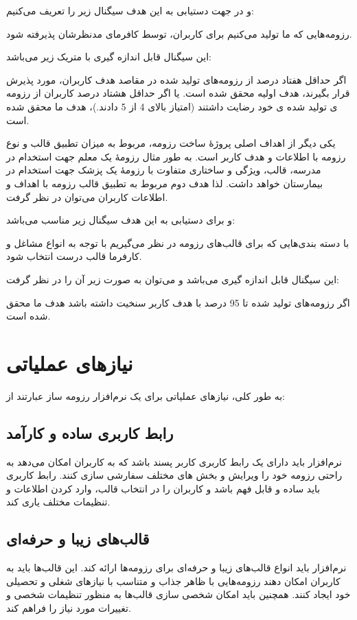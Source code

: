\documentclass[]{article}
\begin{document}
	و در جهت دستیابی به این هدف سیگنال زیر را تعریف می‌کنیم:
	
	رزومه‌هایی که ما تولید می‌کنیم برای کاربران، توسط کافرمای مدنظرشان پذیرفته شود.
	
	این سیگنال قابل اندازه گیری با متریک زیر می‌باشد:
	
	اگر حداقل هفتاد درصد از رزومه‌های تولید شده در مقاصد هدف کاربران، مورد پذیرش قرار بگیرند‌، هدف اولیه محقق شده است.
	یا اگر حداقل هشتاد درصد کاربران از رزومه ی تولید شده ی خود رضایت داشتند (امتیاز بالای 4 از 5 دادند.)، هدف ما محقق شده است.
	
	یکی دیگر از اهداف اصلی پروژۀ ساخت رزومه، مربوط به میزان تطبیق قالب و نوع رزومه با اطلاعات و هدف کاربر است. به طور مثال رزومۀ یک معلم جهت استخدام در مدرسه، قالب، ویژگی و ساختاری متفاوت با رزومۀ یک پزشک جهت استخدام در بیمارستان خواهد داشت. 
	لذا هدف دوم مربوط به تطبیق قالب رزومه با اهداف و اطلاعات کاربران می‌توان در نظر گرفت.
	
	
	و برای دستیابی به این هدف سیگنال زیر مناسب می‌باشد:
	
	 با دسته بندی‌هایی که برای قالب‌های رزومه در نظر می‌گیریم با توجه به انواع مشاغل و کارفرما قالب درست انتخاب ‌شود.
	 
	این سیگنال قابل اندازه گیری می‌باشد و می‌توان به صورت زیر آن را در نظر گرفت:
	
 اگر رزومه‌های تولید شده تا 95 درصد با هدف کاربر سنخیت داشته باشد هدف ما محقق شده است.
	
	
	
	
	\section{\huge{نیازهای عملیاتی}}
	
	
	به طور کلی، نیازهای عملیاتی برای یک نرم‌افزار رزومه ساز عبارتند از:
	
	\subsection{\LARGE{رابط کاربری ساده و کارآمد}}
	نرم‌افزار باید دارای یک رابط کاربری کاربر پسند باشد که به کاربران امکان می‌دهد به راحتی رزومه خود را ویرایش و بخش های مختلف سفارشی سازی  کنند. رابط کاربری باید ساده و قابل فهم باشد و کاربران را در انتخاب قالب، وارد کردن اطلاعات و تنظیمات مختلف یاری کند.
	
	\subsection{\LARGE{قالب‌های زیبا و حرفه‌ای}}
	نرم‌افزار باید انواع قالب‌های زیبا و حرفه‌ای برای رزومه‌ها ارائه کند. این قالب‌ها باید به کاربران امکان دهند رزومه‌هایی با ظاهر جذاب و متناسب با نیازهای شغلی و تحصیلی خود ایجاد کنند. همچنین باید امکان شخصی سازی قالب‌ها به منظور تنظیمات شخصی و تغییرات مورد نیاز را فراهم کند.
	
\end{document}
